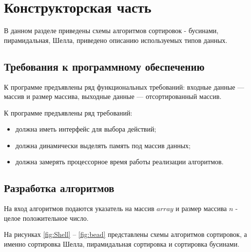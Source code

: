 \chapter{Конструкторская часть}

В данном разделе приведены схемы алгоритмов сортировок - бусинами, пирамидальная, Шелла, приведено описанию используемых типов данных.

\section{Требования к программному обеспечению}

К программе предъявлены ряд функциональных требований: входные данные --- массив и размер массива, выходные данные --- отсортированный массив.

К программе предъявлены ряд требований:

\begin{itemize}[label=---]
	\item должна иметь интерфейс для выбора действий;
	\item должна динамически выделять память под массив данных;
	\item должна замерять процессорное время работы реализации алгоритмов.
\end{itemize}

\section{Разработка алгоритмов}

На вход алгоритмов подаются указатель на массив $array$ и размер массива $n$ - целое положительное число.

На рисунках \ref{fig:Shell} -- \ref{fig:bead} представлены схемы алгоритмов сортировок, а именно сортировка Шелла, пирамидальная сортировка и сортировка бусинами.


